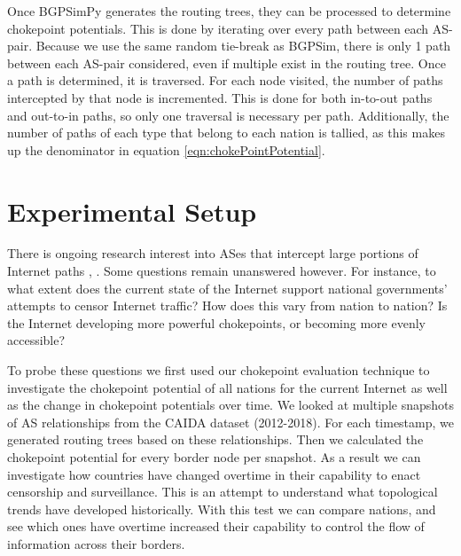 \documentclass[10pt, conference, letterpaper]{IEEEtran}
\begin{document}
\par
Once BGPSimPy generates the routing trees, they can be processed to determine chokepoint potentials. This is done by iterating over every path between each AS-pair. Because
we use the same random tie-break as BGPSim, there is only 1 path between each AS-pair considered, even if multiple exist in the routing tree. Once a path is determined, it is
traversed. For each node visited, the number of paths intercepted by that node is incremented. This is done for both in-to-out paths and out-to-in paths, so only one traversal is
necessary per path. Additionally, the number of paths of each type that belong to each nation is tallied, as this makes up the denominator in equation \ref{eqn:chokePointPotential}.

\section{Experimental Setup}

There is ongoing research interest into ASes that intercept large portions of Internet paths \cite{throats}, \cite{decoy}. Some questions remain unanswered however. For instance, to what
extent does the current state of the Internet support national governments' attempts to censor Internet traffic? How does this vary from nation to nation? Is the Internet developing more
powerful chokepoints, or becoming more evenly accessible?
\par
To probe these questions we first used our chokepoint evaluation technique to investigate the chokepoint potential of all nations for the current Internet as well as the
change in chokepoint potentials over time. We looked at multiple snapshots of AS relationships from the CAIDA dataset (2012-2018).
For each timestamp, we generated routing trees based on these relationships. Then we calculated the chokepoint potential for every border node per snapshot. As a result we can investigate
how countries have changed overtime in their capability to enact censorship and surveillance. This is an attempt to understand what topological trends have developed historically.
With this test we can compare nations, and see which ones have overtime increased their capability to control the flow of information across their borders.
\end{document}

